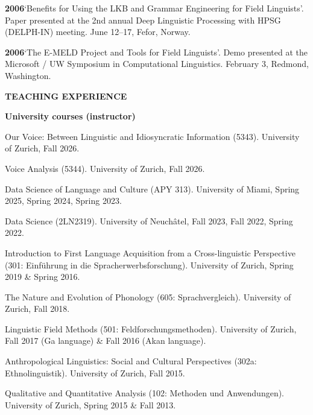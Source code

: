 \documentclass[11pt]{article}
\newcommand{\hangpara}{
 \setlength{\parindent}{0in} %
 \hangindent=0.42in %
}
\begin{document}
\vskip 6pt
\hangpara
{\bf 2006}\hspace{1ex}`Benefits for Using the LKB and Grammar Engineering for Field Linguists'. Paper presented at the 2nd annual Deep Linguistic Processing with HPSG (DELPH-IN) meeting. June 12--17, Fefor, Norway.

\vskip 6pt
\hangpara
{\bf 2006}\hspace{1ex}`The E-MELD Project and Tools for Field Linguists'. Demo presented at the Microsoft / UW Symposium in Computational Linguistics. February 3, Redmond, Washington.

\vskip 20pt
\begin{flushleft}
{\bf TEACHING EXPERIENCE}
\end{flushleft}

\begin{flushleft}
{\bf University courses (instructor)}
\end{flushleft}


\hangpara Our Voice: Between Linguistic and Idiosyncratic Information (5343). University of Zurich, Fall 2026.

\vskip 6pt
\hangpara Voice Analysis (5344). University of Zurich, Fall 2026.

\vskip 6pt
\hangpara Data Science of Language and Culture (APY 313). University of Miami, Spring 2025, Spring 2024, Spring 2023.

\vskip 6pt
\hangpara Data Science (2LN2319). University of Neuchâtel, Fall 2023, Fall 2022, Spring 2022.

\vskip 6pt
\hangpara Introduction to First Language Acquisition from a Cross-linguistic Perspective (301: Einf{\"u}hrung in die Spracherwerbsforschung). University of Zurich, Spring 2019 \& Spring 2016.

\vskip 6pt
\hangpara The Nature and Evolution of Phonology (605: Sprachvergleich). University of Zurich, Fall 2018.

\vskip 6pt
\hangpara Linguistic Field Methods (501: Feldforschungsmethoden). University of Zurich, Fall 2017 (Ga language) \& Fall 2016 (Akan language).

\vskip 6pt
\hangpara Anthropological Linguistics: Social and Cultural Perspectives (302a: Ethnolinguistik). University of Zurich, Fall 2015.

\vskip 6pt
\hangpara Qualitative and Quantitative Analysis (102: Methoden und Anwendungen). University of Zurich, Spring 2015 \& Fall 2013.
\end{document}
